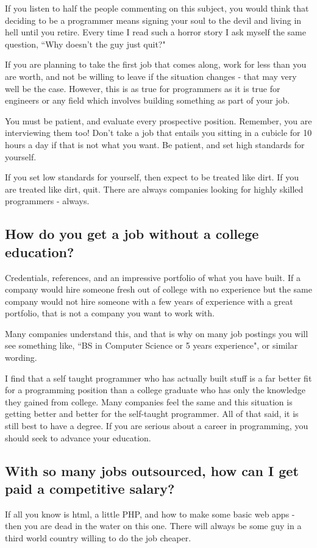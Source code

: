 \documentclass[a4paper,12pt]{article}
\begin{document}
If you listen to half the people commenting on this subject, you would think that deciding to be a programmer means signing your soul to the devil and living in hell until you retire. Every time I read such a horror story I ask myself the same question, ``Why doesn't the guy just quit?"

If you are planning to take the first job that comes along, work for less than you are worth, and not be willing to leave if the situation changes - that may very well be the case. However, this is as true for programmers as it is true for engineers or any field which involves building something as part of your job.

You must be patient, and evaluate every prospective position. Remember, you are interviewing them too! Don't take a job that entails you sitting in a cubicle for 10 hours a day if that is not what you want. Be patient, and set high standards for yourself.

If you set low standards for yourself, then expect to be treated like dirt. If you are treated like dirt, quit. There are always companies looking for highly skilled programmers - always.
\subsection{How do you get a job without a college education?}
Credentials, references, and an impressive portfolio of what you have built. If a company would hire someone fresh out of college with no experience but the same company would not hire someone with a few years of experience with a great portfolio, that is not a company you want to work with.

Many companies understand this, and that is why on many job postings you will see something like, ``BS in Computer Science or 5 years experience", or similar wording.

I find that a self taught programmer who has actually built stuff is a far better fit for a programming position than a college graduate who has only the knowledge they gained from college. Many companies feel the same and this situation is getting better and better for the self-taught programmer. All of that said, it is still best to have a degree. If you are serious about a career in programming, you should seek to advance your education.
\subsection{With so many jobs outsourced, how can I get paid a competitive salary?}
If all you know is html, a little PHP, and how to make some basic web apps - then you are dead in the water on this one. There will always be some guy in a third world country willing to do the job cheaper.
\end{document}
